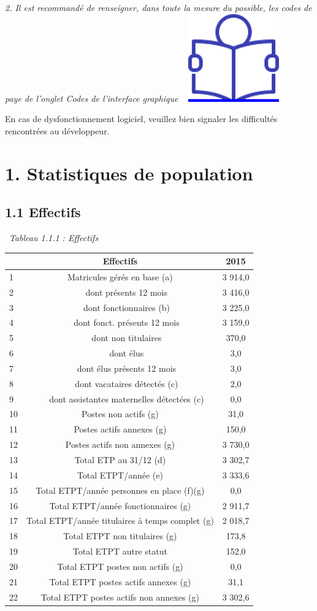 \emph{2. Il est recommandé de renseigner, dans toute la mesure du
possible, les codes de paye de l'onglet Codes de l'interface graphique}
~
\href{../Docs/Notices/fiche_onglet_codes.odt}{\includegraphics{icones/Notice.png}}

En cas de dysfonctionnement logiciel, veuillez bien signaler les
difficultés rencontrées au développeur.

\hypertarget{statistiques-de-population}{%
\section{1. Statistiques de
population}\label{statistiques-de-population}}

\hypertarget{effectifs}{%
\subsection{1.1 Effectifs}\label{effectifs}}

~\emph{Tableau 1.1.1 : Effectifs}

\begin{longtable}[]{@{}lcc@{}}
\toprule
& Effectifs & 2015\tabularnewline
\midrule
\endhead
1 & Matricules gérés en base (a) & 3 914,0\tabularnewline
2 & ~~~dont présents 12 mois & 3 416,0\tabularnewline
3 & ~~~dont fonctionnaires (b) & 3 225,0\tabularnewline
4 & ~~~dont fonct. présents 12 mois & 3 159,0\tabularnewline
5 & ~~~dont non titulaires & 370,0\tabularnewline
6 & ~~~dont élus & 3,0\tabularnewline
7 & ~~~dont élus présents 12 mois & 3,0\tabularnewline
8 & ~~~dont vacataires détectés (c) & 2,0\tabularnewline
9 & ~~~dont assistantes maternelles détectées (c) & 0,0\tabularnewline
10 & Postes non actifs (g) & 31,0\tabularnewline
11 & Postes actifs annexes (g) & 150,0\tabularnewline
12 & Postes actifs non annexes (g) & 3 730,0\tabularnewline
13 & Total ETP au 31/12 (d) & 3 302,7\tabularnewline
14 & Total ETPT/année (e) & 3 333,6\tabularnewline
15 & Total ETPT/année personnes en place (f)(g) & 0,0\tabularnewline
16 & Total ETPT/année fonctionnaires (g) & 2 911,7\tabularnewline
17 & Total ETPT/année titulaires à temps complet (g) & 2
018,7\tabularnewline
18 & Total ETPT non titulaires (g) & 173,8\tabularnewline
19 & Total ETPT autre statut & 152,0\tabularnewline
20 & Total ETPT postes non actifs (g) & 0,0\tabularnewline
21 & Total ETPT postes actifs annexes (g) & 31,1\tabularnewline
22 & Total ETPT postes actifs non annexes (g) & 3 302,6\tabularnewline
\bottomrule
\end{longtable}

